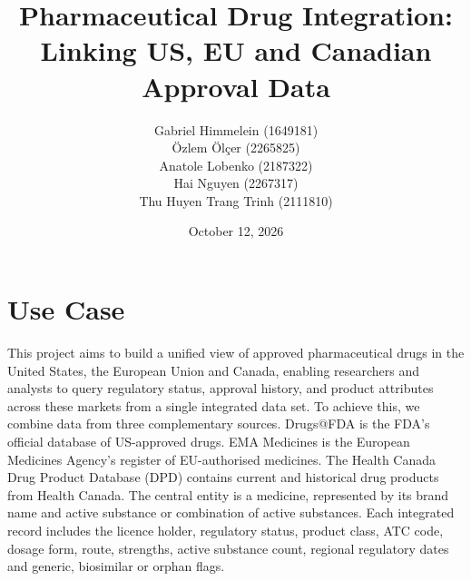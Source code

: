 \documentclass[a4paper,oneside]{scrbook}
\begin{document}
\makeatletter
\renewcommand\thesection{\arabic{section}}
\renewcommand\thesubsection{\arabic{section}.\arabic{subsection}}
\renewcommand\thesubsubsection{\arabic{section}.\arabic{subsection}.\arabic{subsubsection}}
\makeatother

\subject{Web Data Integration \\ Project Outline} 
\title{Pharmaceutical Drug Integration: Linking US, EU and Canadian Approval Data}
\author{
  Gabriel Himmelein (1649181)\\
  Özlem Ölçer (2265825)\\
  Anatole Lobenko (2187322)\\
  Hai Nguyen (2267317)\\ 
  Thu Huyen Trang Trinh (2111810)
} \date{October 12, 2026}
\publishers{{\small Submitted to}\\
  Data and Web Science Group\\
  Dr. Ralph Peeters\\
  Prof. Dr. Christian Bizer\\
  University of Mannheim\\}
\maketitle

\section{Use Case}

This project aims to build a unified view of approved pharmaceutical drugs in the United
States, the European Union and Canada, enabling researchers and analysts to query regulatory
status, approval history, and product attributes across these markets from a single integrated data set. To achieve this, we combine data from three complementary sources.
Drugs@FDA is the FDA's official database of US-approved drugs. EMA Medicines is
the European Medicines Agency's register of EU-authorised medicines. The Health
Canada Drug Product Database (DPD) contains current and historical drug products from
Health Canada. The central entity is a medicine, represented by its brand name and active
substance or combination of active substances. Each integrated record includes the licence
holder, regulatory status, product class, ATC code, dosage form, route, strengths, active
substance count, regional regulatory dates and generic, biosimilar or orphan flags.
\end{document}
